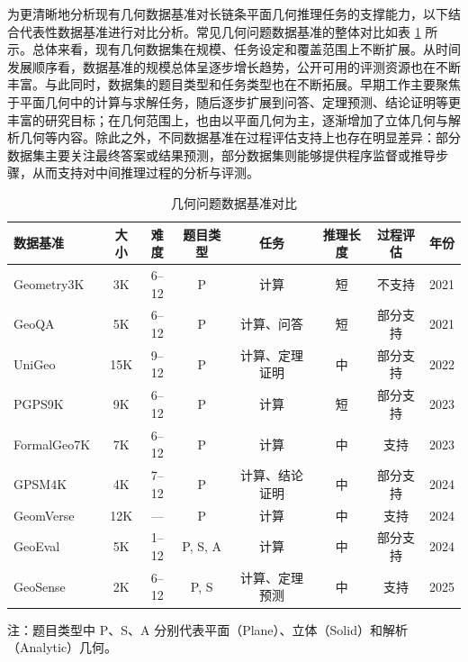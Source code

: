 为更清晰地分析现有几何数据基准对长链条平面几何推理任务的支撑能力，以下结合代表性数据基准进行对比分析。常见几何问题数据基准的整体对比如表 \ref{tab:geo_datasets} 所示。总体来看，现有几何数据集在规模、任务设定和覆盖范围上不断扩展。从时间发展顺序看，数据基准的规模总体呈逐步增长趋势，公开可用的评测资源也在不断丰富。与此同时，数据集的题目类型和任务类型也在不断拓展。早期工作主要聚焦于平面几何中的计算与求解任务，随后逐步扩展到问答、定理预测、结论证明等更丰富的研究目标；在几何范围上，也由以平面几何为主，逐渐增加了立体几何与解析几何等内容。除此之外，不同数据基准在过程评估支持上也存在明显差异：部分数据集主要关注最终答案或结果预测，部分数据集则能够提供程序监督或推导步骤，从而支持对中间推理过程的分析与评测。

\begin{table}[htbp]
    \centering
    \small
    \caption{几何问题数据基准对比}
    \label{tab:geo_datasets}
    \begin{tabularx}{\textwidth}{lccccccc}
        \toprule
        数据基准                                  & 大小  & 难度    & 题目类型    & 任务      & 推理长度 & 过程评估 & 年份   \\
        \midrule
        Geometry3K~\cite{lu2021intergps}      & 3K  & 6--12 & P       & 计算      & 短    & 不支持  & 2021 \\
        GeoQA~\cite{chen2021geoqa}            & 5K  & 6--12 & P       & 计算、问答   & 短    & 部分支持 & 2021 \\
        UniGeo~\cite{chen2022unigeo}          & 15K & 9--12 & P       & 计算、定理证明 & 中    & 部分支持 & 2022 \\
        PGPS9K~\cite{zhang2023pgps}           & 9K  & 6--12 & P       & 计算      & 短    & 部分支持 & 2023 \\
        FormalGeo7K~\cite{zhang2023formalgeo} & 7K  & 6--12 & P       & 计算      & 中    & 支持   & 2023 \\
        GPSM4K~\cite{jaiswal2024gpsm4k}       & 4K  & 7--12 & P       & 计算、结论证明 & 中    & 部分支持 & 2024 \\
        GeomVerse~\cite{kazemi2023geomverse}  & 12K & ---   & P       & 计算      & 中    & 支持   & 2024 \\
        GeoEval~\cite{zhang2024geoeval}       & 5K  & 1--12 & P, S, A & 计算      & 中    & 部分支持 & 2024 \\
        GeoSense~\cite{xu2025geosense}        & 2K  & 6--12 & P, S    & 计算、定理预测 & 中    & 支持   & 2025 \\
        \bottomrule
    \end{tabularx}

    \vspace{1ex}
    \raggedright \footnotesize
    注：题目类型中 P、S、A 分别代表平面（Plane）、立体（Solid）和解析（Analytic）几何。
\end{table}

